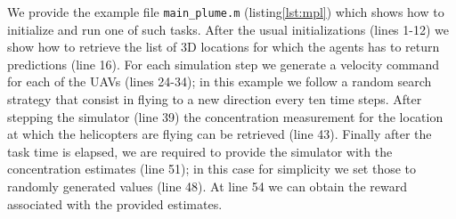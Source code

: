 \documentclass[a4paper,11pt]{report}
\begin{document}
We provide the example file \texttt{main\_plume.m} (listing\ref{lst:mpl}) which shows how to initialize and run one of such tasks.
After the usual initializations (lines 1-12) we show how to retrieve the list of 3D locations for which the agents 
has to return predictions (line 16). For each simulation step we generate a velocity command for each of the UAVs (lines 24-34); in this example we follow a random search strategy that consist in flying to a new direction every ten time steps. After stepping the simulator (line 39) the concentration measurement for the location at which the helicopters are flying can be retrieved (line 43).
Finally after the task time is elapsed, we are required to provide the simulator with the concentration estimates (line 51); in this case for simplicity we set those to randomly generated values (line 48). At line 54 we can obtain the reward associated with the provided estimates.
\end{document}
